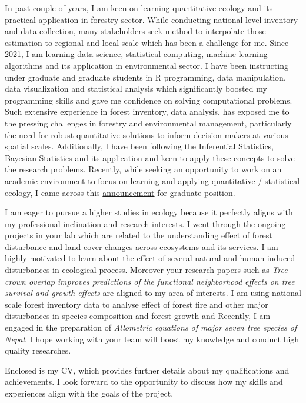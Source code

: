 \documentclass[
]{article}
\begin{document}
In past couple of years, I am keen on learning quantitative ecology and
its practical application in forestry sector. While conducting national
level inventory and data collection, many stakeholders seek method to
interpolate those estimation to regional and local scale which has been
a challenge for me. Since 2021, I am learning data science, statistical
computing, machine learning algorithms and its application in
environmental sector. I have been instructing under graduate and
graduate students in R programming, data manipulation, data
visualization and statistical analysis which significantly boosted my
programming skills and gave me confidence on solving computational
problems. Such extensive experience in forest inventory, data analysis,
has exposed me to the pressing challenges in forestry and environmental
management, particularly the need for robust quantitative solutions to
inform decision-makers at various spatial scales. Additionally, I have
been following the Inferential Statistics, Bayesian Statistics and its
application and keen to apply these concepts to solve the research
problems. Recently, while seeking an opportunity to work on an academic
environment to focus on learning and applying quantitative / statistical
ecology, I came across this
\href{https://uriartelab.org/opportunities/}{announcement} for graduate
position.

I am eager to pursue a higher studies in ecology because it perfectly
aligns with my professional inclination and research interests. I went
through the
\href{https://www.columbia.edu/~mu2126/researchprojects.html}{ongoing
projects} in your lab which are related to the understanding effect of
forest disturbance and land cover changes across ecosystems and its
services. I am highly motivated to learn about the effect of several
natural and human induced disturbances in ecological process. Moreover
your research papers such as \emph{Tree crown overlap improves
predictions of the functional neighborhood effects on tree survival and
growth effects} are aligned to my area of interests. I am using national
scale forest inventory data to analyse effect of forest fire and other
major disturbances in species composition and forest growth and
Recently, I am engaged in the preparation of \emph{Allometric equations
of major seven tree species of Nepal}. I hope working with your team
will boost my knowledge and conduct high quality researches.

Enclosed is my CV, which provides further details about my
qualifications and achievements. I look forward to the opportunity to
discuss how my skills and experiences align with the goals of the
project.
\end{document}
